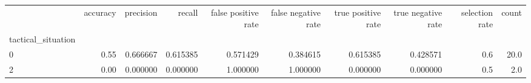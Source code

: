 \begin{tabular}{lrrrrrrrrr}
\toprule
{} &  accuracy &  precision &    recall &  false positive rate &  false negative rate &  true positive rate &  true negative rate &  selection rate &  count \\
tactical\_situation &           &            &           &                      &                      &                     &                     &                 &        \\
\midrule
0                  &      0.55 &   0.666667 &  0.615385 &             0.571429 &             0.384615 &            0.615385 &            0.428571 &             0.6 &   20.0 \\
2                  &      0.00 &   0.000000 &  0.000000 &             1.000000 &             1.000000 &            0.000000 &            0.000000 &             0.5 &    2.0 \\
\bottomrule
\end{tabular}
